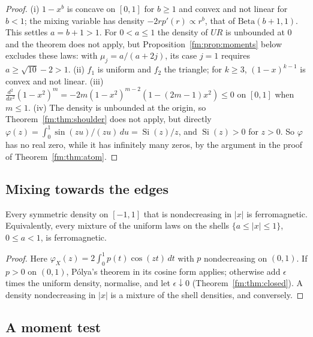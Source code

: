 \begin{proof}
(i) $1-x^b$ is concave on $[0,1]$ for $b\ge1$ and convex and not linear for $b<1$; the mixing variable has density $-2rp'(r)\propto r^b$, that of $\mathrm{Beta}(b+1,1)$. This settles $a=b+1>1$. For $0<a\le1$ the density of $UR$ is unbounded at $0$ and the theorem does not apply, but Proposition~\ref{fm:prop:moments} below excludes these laws: with $\mu_j=a/(a+2j)$, its case $j=1$ requires $a\ge\sqrt{10}-2>1$. (ii) $f_1$ is uniform and $f_2$ the triangle; for $k\ge3$, $(1-x)^{k-1}$ is convex and not linear. (iii) $\frac{d^2}{dx^2}(1-x^2)^m=-2m(1-x^2)^{m-2}(1-(2m-1)x^2)\le0$ on $[0,1]$ when $m\le1$. (iv) The density is unbounded at the origin, so Theorem~\ref{fm:thm:shoulder} does not apply, but directly $\varphi(z)=\int_0^1\sin(zu)/(zu)\,du=\operatorname{Si}(z)/z$, and $\operatorname{Si}(z)>0$ for $z>0$. So $\varphi$ has no real zero, while it has infinitely many zeros, by the argument in the proof of Theorem~\ref{fm:thm:atom}.
\end{proof}



\subsection{Mixing towards the edges}\label{fm:sec:ushaped}



\begin{theorem}\label{fm:thm:ushaped}
Every symmetric density on $[-1,1]$ that is nondecreasing in $|x|$ is ferromagnetic. Equivalently, every mixture of the uniform laws on the shells $\{a\le|x|\le1\}$, $0\le a<1$, is ferromagnetic.
\end{theorem}

\begin{proof}
Here $\varphi_X(z)=2\int_0^1p(t)\cos(zt)\,dt$ with $p$ nondecreasing on $(0,1)$. If $p>0$ on $(0,1)$, P\'olya's theorem in its cosine form \cite{Polya18} applies; otherwise add $\epsilon$ times the uniform density, normalise, and let $\epsilon\downarrow0$ (Theorem~\ref{fm:thm:closed}). A density nondecreasing in $|x|$ is a mixture of the shell densities, and conversely.
\end{proof}



\subsection{A moment test}\label{fm:sec:momenttest}

